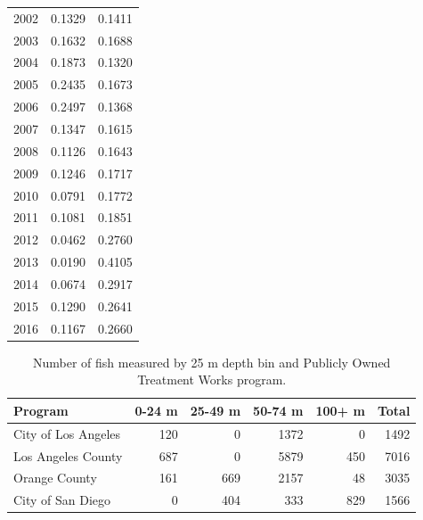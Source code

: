 \documentclass[12pt,]{article}
\begin{document}
\begin{table}[ht]
{\begin{tabular}{rrr}
   2002 & 0.1329 & 0.1411 \\ 
   2003 & 0.1632 & 0.1688 \\ 
   2004 & 0.1873 & 0.1320 \\ 
   2005 & 0.2435 & 0.1673 \\ 
   2006 & 0.2497 & 0.1368 \\ 
   2007 & 0.1347 & 0.1615 \\ 
   2008 & 0.1126 & 0.1643 \\ 
   2009 & 0.1246 & 0.1717 \\ 
   2010 & 0.0791 & 0.1772 \\ 
   2011 & 0.1081 & 0.1851 \\ 
   2012 & 0.0462 & 0.2760 \\ 
   2013 & 0.0190 & 0.4105 \\ 
   2014 & 0.0674 & 0.2917 \\ 
   2015 & 0.1290 & 0.2641 \\ 
   2016 & 0.1167 & 0.2660 \\ 
   \hline
\end{tabular}
}
\end{table}\begin{table}[ht]
\centering
\caption{Number of fish measured by 25 m 
                                              depth bin and Publicly Owned Treatment Works program.} 
\label{tab:Fleet7_lengthdepth}
\begin{tabular}{lrrrrr}
  \hline
Program & 0-24 m & 25-49 m & 50-74 m & 100+ m & Total \\ 
  \hline
City of Los Angeles & 120 &   0 & 1372 &   0 & 1492 \\ 
  Los Angeles County & 687 &   0 & 5879 & 450 & 7016 \\ 
  Orange County & 161 & 669 & 2157 &  48 & 3035 \\ 
  City of San Diego &   0 & 404 & 333 & 829 & 1566 \\ 
   \hline
\end{tabular}
\end{table}

\newpage
\end{document}
